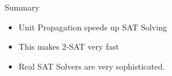 \documentclass[xetex,aspectratio=169,14pt,hyperref={pdfpagelabels=true,pdflang={en-GB}}]{beamer}
\begin{document}
\begin{frame}
  {Summary}

  \begin{itemize}
  \item Unit Propagation speeds up SAT Solving \\
  \item This makes 2-SAT very fast
  \item Real SAT Solvers are very sophisticated.
  \end{itemize}
\end{frame}


\end{document}
